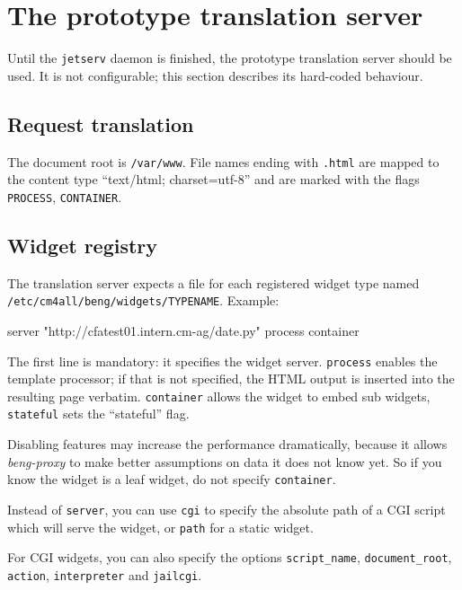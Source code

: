 \documentclass[a4paper,12pt]{article}
\begin{document}
\section{The prototype translation server}

Until the \texttt{jetserv} daemon is finished, the prototype
translation server should be used.  It is not configurable; this
section describes its hard-coded behaviour.

\subsection{Request translation}

The document root is \texttt{/var/www}.  File names ending with
\texttt{.html} are mapped to the content type ``text/html;
charset=utf-8'' and are marked with the flags \verb|PROCESS|,
\verb|CONTAINER|.

\subsection{Widget registry}

The translation server expects a file for each registered widget type
named \texttt{/etc/cm4all/beng/widgets/TYPENAME}.  Example:

\begin{verbatim*}
server "http://cfatest01.intern.cm-ag/date.py"
process
container
\end{verbatim*}

The first line is mandatory: it specifies the widget server.
\texttt{process} enables the template processor; if that is not
specified, the HTML output is inserted into the resulting page
verbatim.  \texttt{container} allows the widget to embed sub widgets,
\texttt{stateful} sets the ``stateful'' flag.

Disabling features may increase the performance dramatically, because
it allows \emph{beng-proxy} to make better assumptions on data it does
not know yet.  So if you know the widget is a leaf widget, do not
specify \texttt{container}.

Instead of \texttt{server}, you can use \texttt{cgi} to specify the
absolute path of a CGI script which will serve the widget, or
\texttt{path} for a static widget.

For CGI widgets, you can also specify the options
\texttt{script\_name}, \texttt{docu\-ment\_root}, \texttt{action},
\texttt{interpreter} and \texttt{jailcgi}.
\end{document}
